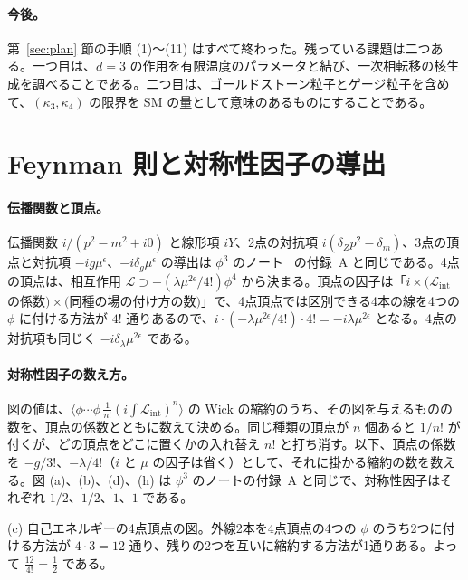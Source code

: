 \documentclass[a4paper,10pt]{ltjsarticle}
\begin{document}
\paragraph{今後。}第~\ref{sec:plan} 節の手順 (1)〜(11) はすべて終わった。残っている課題は二つある。一つ目は、$d=3$ の作用を有限温度のパラメータと結び、一次相転移の核生成を調べることである。二つ目は、ゴールドストーン粒子とゲージ粒子を含めて、$(\kappa_3,\kappa_4)$ の限界を SM の量として意味のあるものにすることである。

\appendix

\section{Feynman 則と対称性因子の導出}\label{app:rules}

\paragraph{伝播関数と頂点。}伝播関数 $i/(p^2-m^2+i0)$ と線形項 $iY$、2点の対抗項 $i(\delta_Zp^2-\delta_m)$、3点の頂点と対抗項 $-ig\mu^\epsilon$、$-i\delta_g\mu^\epsilon$ の導出は $\phi^3$ のノート~\cite{phi3note} の付録~A と同じである。4点の頂点は、相互作用 $\mathcal{L}\supset-(\lambda\mu^{2\epsilon}/4!)\phi^4$ から決まる。頂点の因子は「$i\times(\mathcal{L}_{\mathrm{int}}$ の係数$)\times($同種の場の付け方の数$)$」で、4点頂点では区別できる4本の線を4つの $\phi$ に付ける方法が $4!$ 通りあるので、$i\cdot(-\lambda\mu^{2\epsilon}/4!)\cdot4!=-i\lambda\mu^{2\epsilon}$ となる。4点の対抗項も同じく $-i\delta_\lambda\mu^{2\epsilon}$ である。

\paragraph{対称性因子の数え方。}図の値は、$\langle\phi\cdots\phi\,\frac{1}{n!}(i\int\mathcal{L}_{\mathrm{int}})^n\rangle$ の Wick の縮約のうち、その図を与えるものの数を、頂点の係数とともに数えて決める。同じ種類の頂点が $n$ 個あると $1/n!$ が付くが、どの頂点をどこに置くかの入れ替え $n!$ と打ち消す。以下、頂点の係数を $-g/3!$、$-\lambda/4!$（$i$ と $\mu$ の因子は省く）として、それに掛かる縮約の数を数える。図 (a)、(b)、(d)、(h) は $\phi^3$ のノートの付録~A と同じで、対称性因子はそれぞれ $1/2$、$1/2$、$1$、$1$ である。

(c) 自己エネルギーの4点頂点の図。外線2本を4点頂点の4つの $\phi$ のうち2つに付ける方法が $4\cdot3=12$ 通り、残りの2つを互いに縮約する方法が1通りある。よって $\frac{12}{4!}=\frac12$ である。
\end{document}
